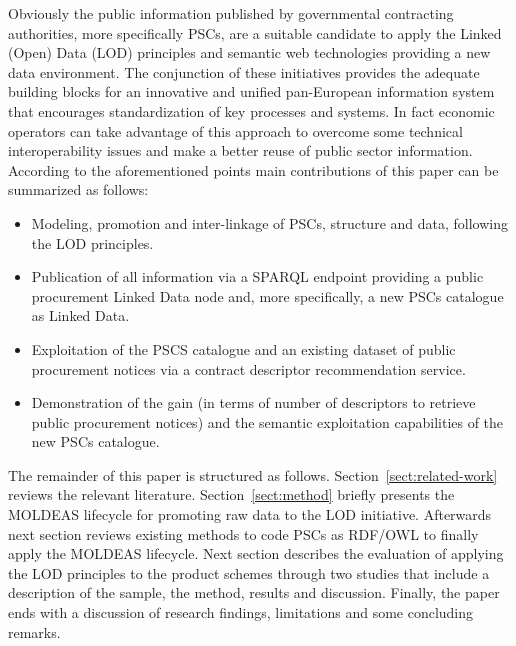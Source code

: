 Obviously the public information published by governmental contracting authorities, more specifically PSCs, are a suitable candidate to apply the Linked (Open) Data 
(LOD) principles and semantic web technologies providing a new data environment. The conjunction of these initiatives provides the adequate building blocks for an 
innovative and unified pan-European information system that encourages standardization of key processes and systems. In fact economic operators can 
take advantage of this approach to overcome some technical interoperability issues and make a better reuse of public sector information. According to the 
aforementioned points main contributions of this paper can be summarized as follows:
\begin{itemize}
\item Modeling, promotion and inter-linkage of PSCs, structure and data, following the LOD principles.
\item Publication of all information via a SPARQL endpoint providing a public procurement Linked Data node and, more specifically, a new PSCs catalogue as Linked Data.
\item Exploitation of the PSCS catalogue and an existing dataset of public procurement notices via a contract descriptor recommendation service.
\item Demonstration of the gain (in terms of number of descriptors to retrieve public procurement notices) and the semantic exploitation 
capabilities of the new PSCs catalogue.
\end{itemize}

The remainder of this paper is structured as follows. Section~\ref{sect:related-work} reviews the relevant literature. 
Section~\ref{sect:method} briefly presents the MOLDEAS lifecycle for promoting raw data to the LOD initiative. 
Afterwards next section reviews existing methods to code PSCs as RDF/OWL to finally apply the MOLDEAS lifecycle. 
Next section describes the evaluation of applying the LOD principles to the product 
schemes through two studies that include a description of the sample, the method, results and discussion. Finally, 
the paper ends with a discussion of research findings, limitations and some concluding remarks.
